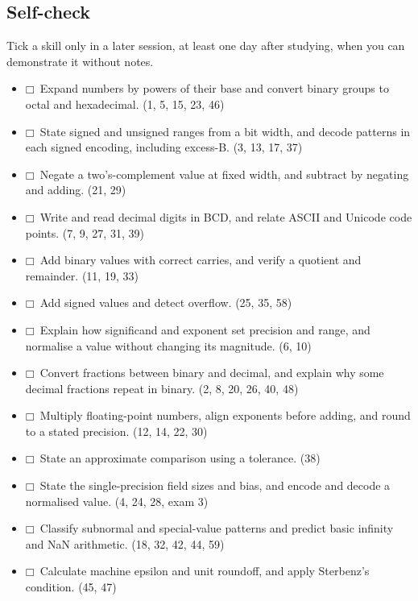 \documentclass[11pt]{article}
\begin{document}
\begin{keepsection}
\section{Self-check}

Tick a skill only in a later session, at least one day after studying, when you can demonstrate it without notes.

\begin{itemize}
\item $\mdlgwhtsquare$\  Expand numbers by powers of their base and convert binary groups to octal and hexadecimal. (1, 5, 15, 23, 46)
\item $\mdlgwhtsquare$\  State signed and unsigned ranges from a bit width, and decode patterns in each signed encoding, including excess-B. (3, 13, 17, 37)
\item $\mdlgwhtsquare$\  Negate a two’s-complement value at fixed width, and subtract by negating and adding. (21, 29)
\item $\mdlgwhtsquare$\  Write and read decimal digits in BCD, and relate ASCII and Unicode code points. (7, 9, 27, 31, 39)
\item $\mdlgwhtsquare$\  Add binary values with correct carries, and verify a quotient and remainder. (11, 19, 33)
\item $\mdlgwhtsquare$\  Add signed values and detect overflow. (25, 35, 58)
\item $\mdlgwhtsquare$\  Explain how significand and exponent set precision and range, and normalise a value without changing its magnitude. (6, 10)
\item $\mdlgwhtsquare$\  Convert fractions between binary and decimal, and explain why some decimal fractions repeat in binary. (2, 8, 20, 26, 40, 48)
\item $\mdlgwhtsquare$\  Multiply floating-point numbers, align exponents before adding, and round to a stated precision. (12, 14, 22, 30)
\item $\mdlgwhtsquare$\  State an approximate comparison using a tolerance. (38)
\item $\mdlgwhtsquare$\  State the single-precision field sizes and bias, and encode and decode a normalised value. (4, 24, 28, exam 3)
\item $\mdlgwhtsquare$\  Classify subnormal and special-value patterns and predict basic infinity and NaN arithmetic. (18, 32, 42, 44, 59)
\item $\mdlgwhtsquare$\  Calculate machine epsilon and unit roundoff, and apply Sterbenz’s condition. (45, 47)

\end{itemize}
\end{keepsection}
\end{document}
